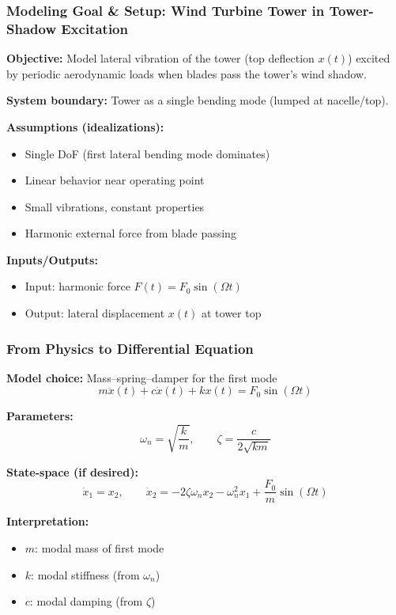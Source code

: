 \documentclass{beamer}
\begin{document}
\begin{frame}
    \frametitle{Modeling Goal \& Setup: Wind Turbine Tower in Tower-Shadow Excitation}

    \textbf{Objective:} Model lateral vibration of the tower (top deflection $x(t)$) excited by periodic aerodynamic loads when blades pass the tower's wind shadow.

    \textbf{System boundary:} Tower as a single bending mode (lumped at nacelle/top).

    \textbf{Assumptions (idealizations):}
    \begin{itemize}
        \item Single DoF (first lateral bending mode dominates)
        \item Linear behavior near operating point
        \item Small vibrations, constant properties
        \item Harmonic external force from blade passing
    \end{itemize}

    \textbf{Inputs/Outputs:}
    \begin{itemize}
        \item Input: harmonic force $F(t) = F_0 \sin(\Omega t)$
        \item Output: lateral displacement $x(t)$ at tower top
    \end{itemize}
\end{frame}

\begin{frame}
    \frametitle{From Physics to Differential Equation}

    \textbf{Model choice:} Mass–spring–damper for the first mode
    \[
    m \ddot{x}(t) + c \dot{x}(t) + k x(t) = F_0 \sin(\Omega t)
    \]

    \textbf{Parameters:}
    \[
    \omega_n = \sqrt{\frac{k}{m}}, \qquad
    \zeta = \frac{c}{2\sqrt{km}}
    \]

    \textbf{State-space (if desired):}
    \[
    \dot{x}_1 = x_2, \qquad
    \dot{x}_2 = -2\zeta \omega_n x_2 - \omega_n^2 x_1 + \frac{F_0}{m}\sin(\Omega t)
    \]

    \textbf{Interpretation:}
    \begin{itemize}
        \item $m$: modal mass of first mode
        \item $k$: modal stiffness (from $\omega_n$)
        \item $c$: modal damping (from $\zeta$)
    \end{itemize}
\end{frame}
\end{document}
